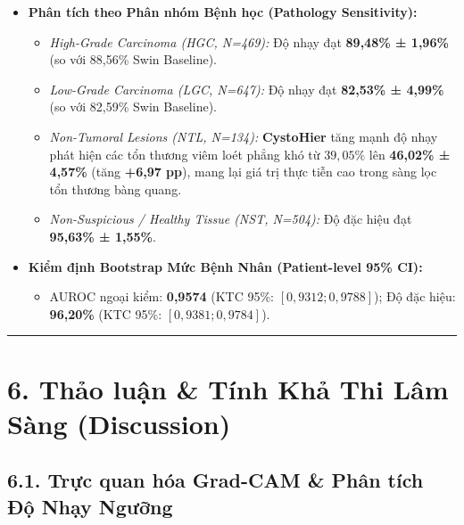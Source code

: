 \documentclass[
  10pt,
  a4paper,
  twocolumn]{article}
\providecommand{\tightlist}{%
  \setlength{\itemsep}{0pt}\setlength{\parskip}{0pt}}
\begin{document}
\begin{itemize}
\tightlist
\item
  \textbf{Phân tích theo Phân nhóm Bệnh học (Pathology Sensitivity):}

  \begin{itemize}
  \tightlist
  \item
    \emph{High-Grade Carcinoma (HGC, N=469):} Độ nhạy đạt
    \textbf{89,48\% ± 1,96\%} (so với 88,56\% Swin Baseline).
  \item
    \emph{Low-Grade Carcinoma (LGC, N=647):} Độ nhạy đạt \textbf{82,53\%
    ± 4,99\%} (so với 82,59\% Swin Baseline).
  \item
    \emph{Non-Tumoral Lesions (NTL, N=134):} \textbf{CystoHier} tăng
    mạnh độ nhạy phát hiện các tổn thương viêm loét phẳng khó từ
    \(39{,}05\%\) lên \textbf{46,02\% ± 4,57\%} (tăng \textbf{+6,97
    pp}), mang lại giá trị thực tiễn cao trong sàng lọc tổn thương bàng
    quang.
  \item
    \emph{Non-Suspicious / Healthy Tissue (NST, N=504):} Độ đặc hiệu đạt
    \textbf{95,63\% ± 1,55\%}.
  \end{itemize}
\item
  \textbf{Kiểm định Bootstrap Mức Bệnh Nhân (Patient-level 95\% CI):}

  \begin{itemize}
  \tightlist
  \item
    AUROC ngoại kiểm: \textbf{0,9574} (KTC 95\%: \([0,9312; 0,9788]\));
    Độ đặc hiệu: \textbf{96,20\%} (KTC 95\%: \([0,9381; 0,9784]\)).
  \end{itemize}
\end{itemize}

\begin{center}\rule{0.5\linewidth}{0.5pt}\end{center}

\section{6. Thảo luận \& Tính Khả Thi Lâm Sàng
(Discussion)}\label{thux1ea3o-luux1eadn-tuxednh-khux1ea3-thi-luxe2m-suxe0ng-discussion}

\subsection{6.1. Trực quan hóa Grad-CAM \& Phân tích Độ Nhạy
Ngưỡng}\label{trux1ef1c-quan-huxf3a-grad-cam-phuxe2n-tuxedch-ux111ux1ed9-nhux1ea1y-ngux1b0ux1ee1ng}
\end{document}
